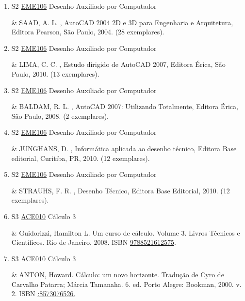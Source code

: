 \documentclass[12pt,a4paper]{book}
\begin{document}
\begin{enumerate}
& HARRINGTON, D.  J. , Desvendando o AutoCAD 2005, Editora Pearson, São Paulo, 2006.  (12 exemplares). 

 

 \item S2 \hyperref[PUD:EME106]{EME106} Desenho Auxiliado por Computador

& SAAD, A.  L. , AutoCAD 2004 2D e 3D para Engenharia e Arquitetura, Editora
Pearson, São Paulo, 2004.  (28 exemplares). 

 

 \item S2 \hyperref[PUD:EME106]{EME106} Desenho Auxiliado por Computador

& LIMA, C.  C. , Estudo dirigido de AutoCAD 2007, Editora Érica, São Paulo, 2010.  (13 exemplares).
 \item S2 \hyperref[PUD:EME106]{EME106} Desenho Auxiliado por Computador

& BALDAM, R.  L. , AutoCAD 2007: Utilizando Totalmente, Editora Érica, São Paulo, 2008.  (2 exemplares). 

 

 \item S2 \hyperref[PUD:EME106]{EME106} Desenho Auxiliado por Computador

& JUNGHANS, D. , Informática aplicada ao desenho técnico, Editora Base editorial, Curitiba, PR, 2010.  (12 exemplares). 

 

 \item S2 \hyperref[PUD:EME106]{EME106} Desenho Auxiliado por Computador

& STRAUHS, F.  R. , Desenho Técnico, Editora Base Editorial, 2010.  (12 exemplares).
 \item S3 \hyperref[PUD:ACE010]{ACE010} Cálculo 3

& Guidorizzi, Hamilton L.  Um curso de cálculo.  Volume 3.  Livros Técnicos e Científicos.  Rio de Janeiro, 2008.  ISBN \href{http://www.bn.br/site/pages/servicosProfissionais/agenciaISBN/isbnBusca/FbnBuscaISBNCatalogo.asp?pField=ISBN&pIntPagina=1&pISBN=21612575&nidbISBN=true&hidbISBN=true}{9788521612575}. 

 

 \item S3 \hyperref[PUD:ACE010]{ACE010} Cálculo 3

&   ANTON, Howard.  Cálculo: um novo horizonte.  Tradução de Cyro de Carvalho Patarra;  Márcia Tamanaha.  6.  ed.  Porto Alegre: Bookman, 2000.  v. 2.  ISBN \href{http://www.google.com/search?hl=pt-BR&tbo=p&tbm=bks&q=isbn::8573076526.&num=10}{:8573076526.} 


\end{enumerate}
\end{document}

